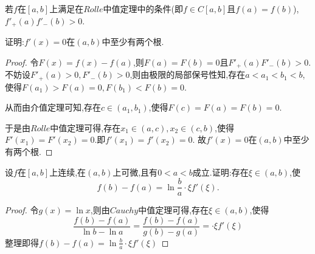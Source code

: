 \documentclass[lang=cn,newtx,10pt,scheme=chinese]{../Template/elegantbook}
\begin{document}
\begin{exercise}
    若$f$在$[a,b]$上满足在$Rolle$中值定理中的条件(即$f\in C[a,b]$且$f(a)=f(b)$),
$f'_+(a)f'_-(b)>0$.

证明:$f'(x)=0$在$(a,b)$中至少有两个根.

\begin{proof}
    令$F(x)=f(x)-f(a)$,则$F(a)=F(b)=0$且$F'_+(a)F'_-(b)>0$.不妨设$F'_+(a)>0,F'_-(b)>0$,则由极限的局部保号性知,存在$a<a_1<b_1<b$,使得$F(a_1)>F(a)=0,F(b_1)<F(b)=0$.
    
    从而由介值定理可知,存在$c\in(a_1,b_1)$,使得$F(c)=F(a)=F(b)=0$.

    于是由$Rolle$中值定理可得,存在$x_1\in(a,c),x_2\in(c,b)$,使得$F'(x_1)=F'(x_2)=0$.即$f'(x_1)=f'(x_2)=0$.
    故$f'(x)=0$在$(a,b)$中至少有两个根.

\end{proof}
\end{exercise}

\begin{exercise}
设$f$在$[a,b]$上连续,在$(a,b)$上可微,且有$0<a<b$成立.证明:存在$\xi\in(a,b)$,使
\begin{equation}
  f(b)-f(a)=\ln\frac{b}{a}\cdot\xi f'(\xi).
  \nonumber
\end{equation}
    \begin{proof}
        令$g(x)=\ln x$,则由$Cauchy$中值定理可得,存在$\xi\in(a,b)$,使得
        \begin{equation}
        \frac{f\left( b \right) -f\left( a \right)}{\ln b-\ln a}=\frac{f\left( b \right) -f\left( a \right)}{g\left( b \right) -g\left( a \right)}=\cdot\xi f'\left( \xi \right) 
            \nonumber
        \end{equation}
        整理即得$f\left( b \right) -f\left( a \right) =\ln \frac{b}{a}\cdot\xi f'\left( \xi \right) $
    
\end{proof}
\end{exercise}
\end{document}
